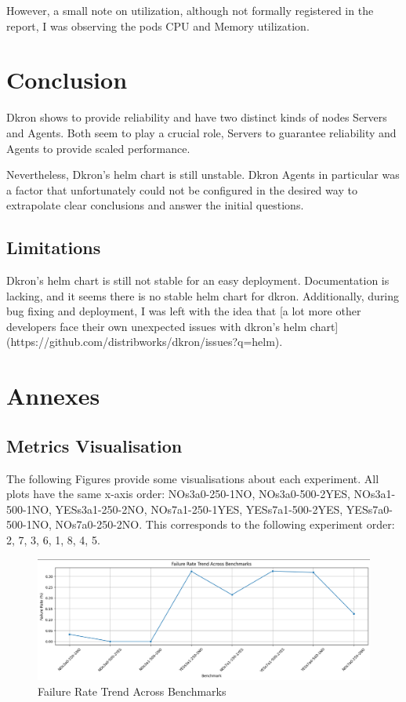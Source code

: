 \documentclass[runningheads]{llncs}
\begin{document}
However,
a small note on utilization, although not formally registered in the report, I was observing the
pods CPU and Memory utilization.

\section{Conclusion}
\label{conclusion}

Dkron shows to provide reliability and have two distinct kinds of nodes Servers and Agents.
Both seem to play a crucial role, Servers to guarantee reliability and Agents to provide scaled performance.

Nevertheless, Dkron's helm chart is still unstable.  Dkron Agents in particular was a factor that unfortunately could not be configured in the
desired way to extrapolate clear conclusions and answer the initial questions.


\subsection{Limitations}
Dkron's helm chart is still not stable for an easy deployment. Documentation is lacking, and
it seems there is no stable helm chart for dkron. Additionally, during bug fixing and deployment,
I was left with the idea that [a lot more other developers face their own
unexpected issues with dkron's helm chart](https://github.com/distribworks/dkron/issues?q=helm).

\section{Annexes}



\subsection{Metrics Visualisation}
The following Figures provide some visualisations about each experiment. All plots have the same x-axis order: NOs3a0-250-1NO, NOs3a0-500-2YES, NOs3a1-500-1NO,  YESs3a1-250-2NO, NOs7a1-250-1YES, YESs7a1-500-2YES,  YESs7a0-500-1NO, NOs7a0-250-2NO. This corresponds to the following experiment order: 2, 7, 3, 6, 1, 8, 4, 5.

\begin{figure}[H]
    \centering
    \includegraphics[width=1\textwidth]{media/FailureRate_trend.png} \caption{Failure Rate Trend Across Benchmarks}
    \label{fig:aaa}
\end{figure}
\end{document}
